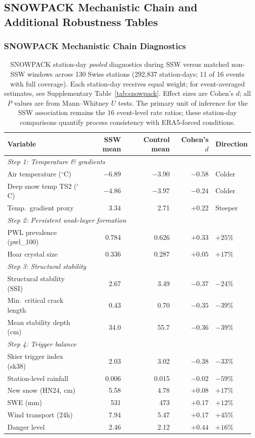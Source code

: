 \documentclass[11pt,letterpaper]{article}
\begin{document}
\subsection*{SNOWPACK Mechanistic Chain and Additional Robustness Tables}

\subsubsection*{SNOWPACK Mechanistic Chain Diagnostics}

\begin{table}[htbp]
\centering
\caption{SNOWPACK station-day \emph{pooled} diagnostics during SSW versus matched non-SSW windows across 130 Swiss stations (292,837 station-days; 11 of 16 events with full coverage). Each station-day receives equal weight; for event-averaged estimates, see Supplementary Table~\ref{tab:snowpack}. Effect sizes are Cohen's $d$; all $P$ values are from Mann--Whitney $U$ tests. The primary unit of inference for the SSW association remains the 16 event-level rate ratios; these station-day comparisons quantify process consistency with ERA5-forced conditions.}
\label{tab:snowpack_mechanism}
\begin{tabular}{lrrrl}
\toprule
Variable & SSW mean & Control mean & Cohen's $d$ & Direction \\
\midrule
\multicolumn{5}{l}{\textit{Step 1: Temperature \& gradients}} \\
Air temperature ($^\circ$C) & $-6.89$ & $-3.90$ & $-0.58$ & Colder \\
Deep snow temp TS2 ($^\circ$C) & $-4.86$ & $-3.97$ & $-0.24$ & Colder \\
Temp.\ gradient proxy & 3.34 & 2.71 & $+0.22$ & Steeper \\
\midrule
\multicolumn{5}{l}{\textit{Step 2: Persistent weak-layer formation}} \\
PWL prevalence (pwl\_100) & 0.784 & 0.626 & $+0.33$ & $+25\%$ \\
Hoar crystal size & 0.336 & 0.287 & $+0.05$ & $+17\%$ \\
\midrule
\multicolumn{5}{l}{\textit{Step 3: Structural stability}} \\
Structural stability (SSI) & 2.67 & 3.49 & $-0.37$ & $-24\%$ \\
Min.\ critical crack length & 0.43 & 0.70 & $-0.35$ & $-39\%$ \\
Mean stability depth (cm) & 34.0 & 55.7 & $-0.36$ & $-39\%$ \\
\midrule
\multicolumn{5}{l}{\textit{Step 4: Trigger balance}} \\
Skier trigger index (sk38) & 2.03 & 3.02 & $-0.38$ & $-33\%$ \\
Station-level rainfall & 0.006 & 0.015 & $-0.02$ & $-59\%$ \\
New snow (HN24, cm) & 5.58 & 4.78 & $+0.08$ & $+17\%$ \\
SWE (mm) & 531 & 473 & $+0.17$ & $+12\%$ \\
Wind transport (24h) & 7.94 & 5.47 & $+0.17$ & $+45\%$ \\
Danger level & 2.46 & 2.12 & $+0.44$ & $+16\%$ \\
\bottomrule
\end{tabular}
\end{table}
\end{document}
